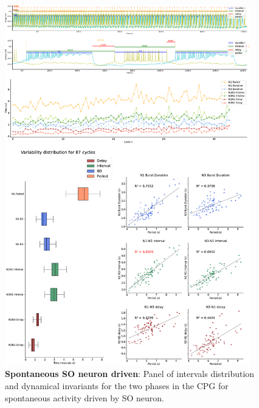 \begin{figure}[htbp]
	\centering
	\includegraphics[width=0.95\textwidth]{./invariants/data/SUSSEX/prep4_so_driven_2/images/panel_with_intervals.pdf}
	\caption{\textbf{Spontaneous SO neuron driven}: Panel of intervals distribution and dynamical invariants for the two phases in the CPG for spontaneous activity driven by SO neuron.}
	\label{fig:so spontaneous invariants 2}
\end{figure}

% 	


